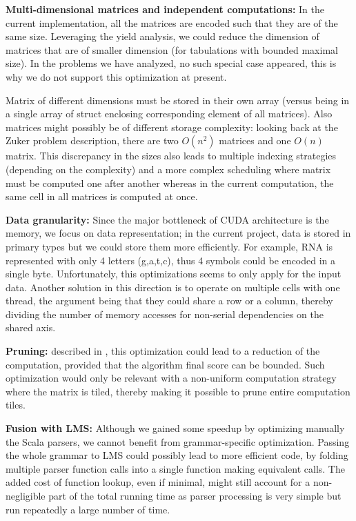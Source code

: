 \item \textbf{Multi-dimensional matrices and independent computations:} In the current implementation, all the matrices are encoded such that they are of the same size. Leveraging the yield analysis, we could reduce the dimension of matrices that are of smaller dimension (for tabulations with bounded maximal size). In the problems we have analyzed, no such special case appeared, this is why we do not support this optimization at present.

Matrix of different dimensions must be stored in their own array (versus being in a single array of struct enclosing corresponding element of all matrices). Also matrices might possibly be of different storage complexity: looking back at the Zuker problem description, there are two $O(n^2)$ matrices and one $O(n)$ matrix. This discrepancy in the sizes also leads to multiple indexing strategies (depending on the complexity) and a more complex scheduling where matrix must be computed one after another whereas in the current computation, the same cell in all matrices is computed at once. 
\item \textbf{Data granularity:} Since the major bottleneck of CUDA architecture is the memory, we focus on data representation; in the current project, data is stored in primary types but we could store them more efficiently. For example, RNA is represented with only 4 letters (g,a,t,c), thus 4 symbols could be encoded in a single byte. Unfortunately, this optimizations seems to only apply for the input data. Another solution in this direction is to operate on multiple cells with one thread, the argument being that they could share a row or a column, thereby dividing the number of memory accesses for non-serial dependencies on the shared axis.
\item \textbf{Pruning:} described in \cite{swat_mega}, this optimization could lead to a reduction of the computation, provided that the algorithm final score can be bounded. Such optimization would only be relevant with a non-uniform computation strategy where the matrix is tiled, thereby making it possible to prune entire computation tiles.
\item \textbf{Fusion with LMS:} Although we gained some speedup by optimizing manually the Scala parsers, we cannot benefit from grammar-specific optimization. Passing the whole grammar to LMS could possibly lead to more efficient code, by folding multiple parser function calls into a single function making equivalent calls. The added cost of function lookup, even if minimal, might still account for a non-negligible part of the total running time as parser processing is very simple but run repeatedly a large number of time.
